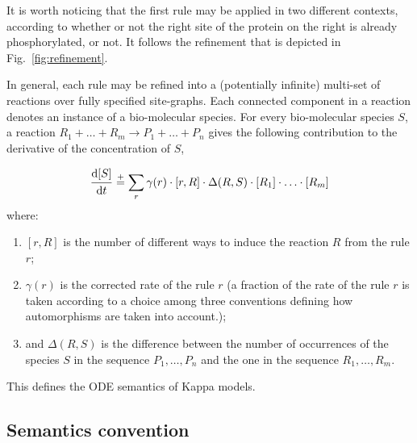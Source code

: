 \documentclass[11pt]{book}
\begin{document}
It is worth noticing that the first rule may be applied in two different contexts, according to whether or not the right site  of the protein on the right  is already phosphorylated, or not. It follows the refinement that is depicted in Fig.~\ref{fig:refinement}.

In general, each rule may be refined into a (potentially infinite) multi-set of reactions over fully specified site-graphs.
Each connected component in a reaction denotes an instance of a bio-molecular species. For every bio-molecular species $S$, a reaction $R_1 + \ldots + R_m {\rightarrow} P_1 + \ldots + P_n$ gives the following contribution to the derivative of the concentration of $S$,

\newcommand{\myfrac}[2]{\frac{\strut \displaystyle #1}{\strut \displaystyle #2}}
\newcommand{\diff}[1]{\myfrac{\mathrm{d}#1}{\mathrm{d}t}}

\begin{equation*}
  \diff{[S]} \stackrel{+}= \sum_r \gamma(r)\cdot[r,R]\cdot\Delta(R,S)\cdot [R_1] \cdot \ldots \cdot [R_m]
\end{equation*}
where:
\begin{enumerate}
  \item $[r,R]$ is the number of different ways to induce the reaction $R$ from the rule $r$;
  \item $\gamma(r)$ is the corrected rate of the rule $r$ (a fraction of the rate of the rule $r$ is taken according to a choice among three  conventions defining how automorphisms are taken into account.);
  \item and $\Delta(R,S)$ is the difference between the number of occurrences of the species $S$ in the sequence $P_1,\ldots,P_n$ and
the one in the sequence $R_1,\ldots,R_m$.
 \end{enumerate}

 This defines the ODE semantics of Kappa models.

\subsection{Semantics convention}
\end{document}
